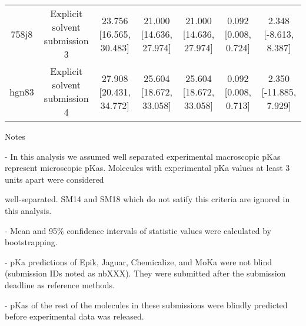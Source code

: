 \documentclass{article}
\begin{document}
\begin{center}
\begin{longtable}{|ccccccc|}
 758j8 &                      Explicit solvent submission 3 &  23.756 [16.565, 30.483] &  21.000 [14.636, 27.974] &  21.000 [14.636, 27.974] &  0.092 [0.008, 0.724] &   2.348 [-8.613, 8.387] \\
 hgn83 &                      Explicit solvent submission 4 &  27.908 [20.431, 34.772] &  25.604 [18.672, 33.058] &  25.604 [18.672, 33.058] &  0.092 [0.008, 0.713] &  2.350 [-11.885, 7.929] \\
\end{longtable}
\end{center}

Notes

- In this analysis we assumed well separated experimental macroscopic pKas represent microscopic pKas. Molecules with experimental pKa values at least 3 units apart were considered

well-separated. SM14 and SM18 which do not satify this criteria are ignored in this analysis.

- Mean and 95\% confidence intervals of statistic values were calculated by bootstrapping.

- pKa predictions of Epik, Jaguar, Chemicalize, and MoKa were not blind (submission IDs noted as nbXXX). They were submitted after the submission deadline as reference methods.

- pKas of the rest of the molecules in these submissions were blindly predicted before experimental data was released.
\end{document}
